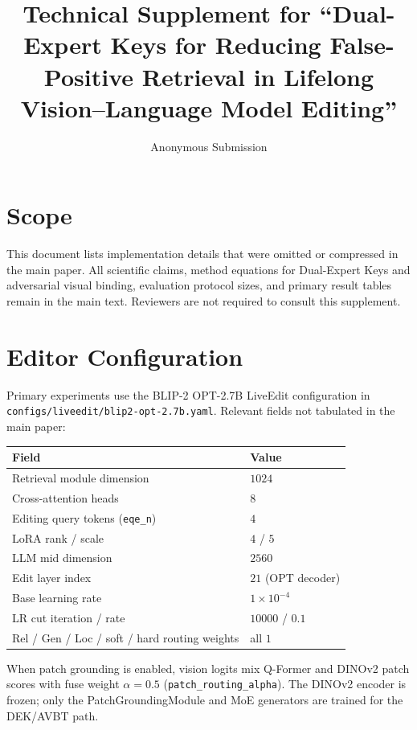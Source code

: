 \documentclass[letterpaper]{article}
\title{Technical Supplement for ``Dual-Expert Keys for Reducing False-Positive Retrieval in Lifelong Vision--Language Model Editing''}
\author{Anonymous Submission}
\begin{document}
\maketitle

\section{Scope}
This document lists implementation details that were omitted or compressed in the main paper.
All scientific claims, method equations for Dual-Expert Keys and adversarial visual binding, evaluation protocol sizes, and primary result tables remain in the main text.
Reviewers are not required to consult this supplement.

\section{Editor Configuration}
Primary experiments use the BLIP-2 OPT-2.7B LiveEdit configuration in \texttt{configs/liveedit/blip2-opt-2.7b.yaml}.
Relevant fields not tabulated in the main paper:

\begin{center}
\small
\begin{tabular}{@{}ll@{}}
\toprule
Field & Value \\
\midrule
Retrieval module dimension & $1024$ \\
Cross-attention heads & $8$ \\
Editing query tokens (\texttt{eqe\_n}) & $4$ \\
LoRA rank / scale & $4$ / $5$ \\
LLM mid dimension & $2560$ \\
Edit layer index & $21$ (OPT decoder) \\
Base learning rate & $1\times10^{-4}$ \\
LR cut iteration / rate & $10000$ / $0.1$ \\
Rel / Gen / Loc / soft / hard routing weights & all $1$ \\
\bottomrule
\end{tabular}
\end{center}

When patch grounding is enabled, vision logits mix Q-Former and DINOv2 patch scores with fuse weight $\alpha{=}0.5$ (\texttt{patch\_routing\_alpha}).
The DINOv2 encoder is frozen; only the PatchGroundingModule and MoE generators are trained for the DEK/AVBT path.
\end{document}
